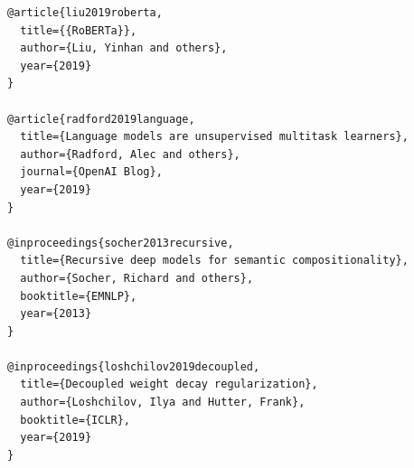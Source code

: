 \begin{lstlisting}
@article{liu2019roberta,
  title={{RoBERTa}},
  author={Liu, Yinhan and others},
  year={2019}
}

@article{radford2019language,
  title={Language models are unsupervised multitask learners},
  author={Radford, Alec and others},
  journal={OpenAI Blog},
  year={2019}
}

@inproceedings{socher2013recursive,
  title={Recursive deep models for semantic compositionality},
  author={Socher, Richard and others},
  booktitle={EMNLP},
  year={2013}
}

@inproceedings{loshchilov2019decoupled,
  title={Decoupled weight decay regularization},
  author={Loshchilov, Ilya and Hutter, Frank},
  booktitle={ICLR},
  year={2019}
}
\end{lstlisting}

